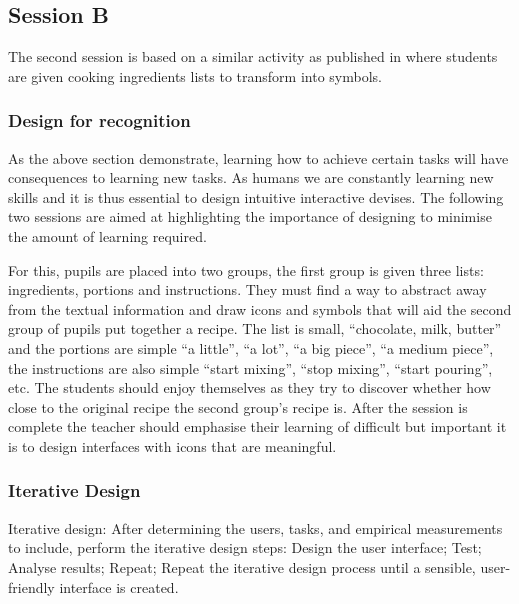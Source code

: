 \documentclass{sig-alternate}
\begin{document}
\subsection{Session B}

The second session is based on a similar activity as published in
\cite{fellows2005} where students are given cooking ingredients lists
to transform into symbols.

\subsubsection*{Design for recognition}
 
As the above section demonstrate, learning how to achieve certain
tasks will have consequences to learning new tasks. As humans we are
constantly learning new skills and it is thus essential to design
intuitive interactive devises. The following two sessions are aimed at
highlighting the importance of designing to minimise the amount of
learning required.

For this, pupils are placed into two groups, the first group is given
three lists: ingredients, portions and instructions. They must find a
way to abstract away from the textual information and draw icons and
symbols that will aid the second group of pupils put together a
recipe. The list is small, ``chocolate, milk, butter'' and the portions
are simple ``a little'', ``a lot'', ``a big piece'', ``a medium piece'', the
instructions are also simple ``start mixing'', ``stop mixing'', ``start
pouring'', etc. The students should enjoy themselves as they try to
discover whether how close to the original recipe the second group's
recipe is. After the session is complete the teacher should emphasise
their learning of difficult but important it is to design interfaces
with icons that are meaningful.



\subsubsection*{Iterative Design}

Iterative design: After determining the users, tasks, and empirical
measurements to include, perform the iterative design steps:
Design the user interface; Test; Analyse results; Repeat; Repeat the iterative design process until a sensible, user-friendly interface is
created.
\end{document}
